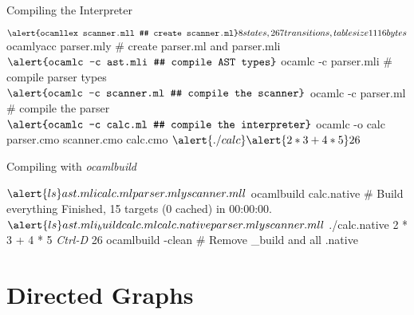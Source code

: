 \documentclass{plt}
\begin{document}
\begin{frame}[fragile]{Compiling the Interpreter}

\begin{semiverbatim}
$ \alert{ocamllex scanner.mll # create scanner.ml}
8 states, 267 transitions, table size 1116 bytes
$ \alert{ocamlyacc parser.mly # create parser.ml and parser.mli}
$ \alert{ocamlc -c ast.mli    # compile AST types}
$ \alert{ocamlc -c parser.mli # compile parser types}
$ \alert{ocamlc -c scanner.ml # compile the scanner}
$ \alert{ocamlc -c parser.ml  # compile the parser}
$ \alert{ocamlc -c calc.ml    # compile the interpreter}
$ \alert{ocamlc -o calc parser.cmo scanner.cmo calc.cmo}
$ \alert{./calc}
\alert{2 * 3 + 4 * 5}
26
$
\end{semiverbatim}

\end{frame}

\begin{frame}[fragile]{Compiling with \emph{ocamlbuild}}

\begin{semiverbatim}
$ \alert{ls}
ast.mli  calc.ml  parser.mly  scanner.mll
$ \alert{ocamlbuild calc.native   # Build everything}
Finished, 15 targets (0 cached) in 00:00:00.
$ \alert{ls}
ast.mli _build calc.ml calc.native parser.mly scanner.mll
$ \alert{./calc.native}
\alert{2 * 3 + 4 * 5}
\alert{\emph{Ctrl-D}}
26
 \alert{ocamlbuild -clean # Remove _build and all .native}
\end{semiverbatim}
  
\end{frame}

\part{Directed Graphs}
\newcommand{\graph}{
  \begin{tikzpicture}[node distance=10pt,
      every node/.style={state, inner sep=3pt,minimum size=10pt,drop shadow,fill=white}]
    \node (a) {a};
    \node (c) [right=of a] {c};
    \node (f) [right=of c] {f};
    \node (b) [above right=of c] {b};
    \node (d) [below right=of c] {d};
    \node (e) [right=of f] {e};
    \node (g) [right=of e] {g};
    \path[->] (a) edge (c)
                  edge (b)
                  edge (d)
              (c) edge (f)
              (b) edge (e)
              (d) edge (e)
              (e) edge (f)
                  edge (g);
  \end{tikzpicture}
}
\end{document}
